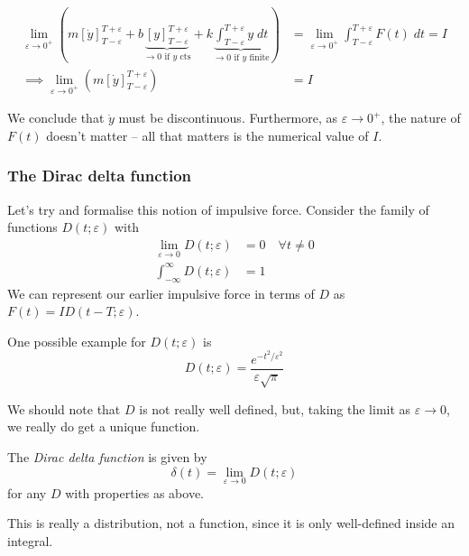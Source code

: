 \documentclass{../template/note}
\begin{document}
    \begin{align*}
        \lim_{\varepsilon \to 0^+} \left(m \left[\dot y\right]_{T - \varepsilon}^{T + \varepsilon} + b\underbrace{\left[y\right]_{T - \varepsilon}^{T + \varepsilon}}_{\to 0 \text{ if } y \text{ cts}} + k \underbrace{\int_{T - \varepsilon}^{T + \varepsilon} y \; dt}_{\to 0 \text{ if } y \text{ finite}}\right) &= \lim_{\varepsilon \to 0^+} \int_{T - \varepsilon}^{T + \varepsilon} F(t) \; dt = I \\
        \implies \lim_{\varepsilon \to 0^+} \left(m \left[\dot y\right]_{T - \varepsilon}^{T + \varepsilon}\right) &= I
    \end{align*}
    
    We conclude that \(\dot y\) must be discontinuous. Furthermore, as \(\varepsilon \to 0^+\), the nature of \(F(t)\) doesn't matter -- all that matters is the numerical value of \(I\).
    
    \subsubsection{The Dirac delta function}

    Let's try and formalise this notion of impulsive force. Consider the family of functions \(D(t; \varepsilon)\) with
    \begin{align*}
        \lim_{\varepsilon \to 0} D(t; \varepsilon) &= 0 \quad \forall t \neq 0 \\
        \int_{-\infty}^\infty D(t; \varepsilon) &= 1 
    \end{align*}
    We can represent our earlier impulsive force in terms of \(D\) as \(F(t) = ID(t - T; \varepsilon)\).

    One possible example for \(D(t; \varepsilon)\) is
    \[
        D(t; \varepsilon) = \frac{e^{-t^2/\varepsilon^2}}{\varepsilon \sqrt{\pi}}
    \]
    
    We should note that \(D\) is not really well defined, but, taking the limit as \(\varepsilon \to 0\), we really do get a unique function.

    \begin{definition}
        The \emph{Dirac delta function} is given by
        \[
            \delta(t) = \lim_{\varepsilon \to 0}D(t; \varepsilon)
        \]
        for any \(D\) with properties as above.
    \end{definition}
    
    \begin{remark*}
        This is really a distribution, not a function, since it is only well-defined inside an integral.
    \end{remark*}
    
\end{document}
